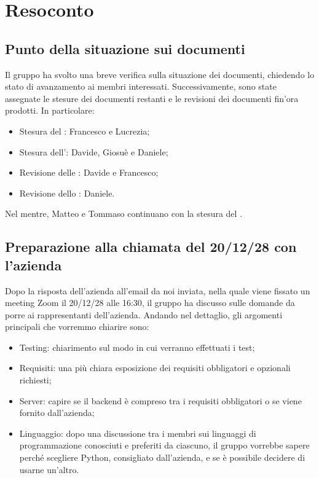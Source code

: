 \section{Resoconto}

\subsection{Punto della situazione sui documenti}

Il gruppo \gruppo{} ha svolto una breve verifica sulla situazione dei documenti, chiedendo lo stato di avanzamento ai membri interessati. Successivamente, sono state assegnate le stesure dei documenti restanti e le revisioni dei documenti fin'ora prodotti. In particolare:
\begin{itemize}
\item Stesura del \PdQ{}: Francesco e Lucrezia;
\item Stesura dell'\AdR{}: Davide, Giosuè e Daniele;
\item Revisione delle \NdP{}: Davide e Francesco;
\item Revisione dello \SdF{}: Daniele.
\end{itemize}
Nel mentre, Matteo e Tommaso continuano con la stesura del \PdP{}.


\subsection{Preparazione alla chiamata del 20/12/28 con l'azienda}

Dopo la risposta dell'azienda all'email da noi inviata, nella quale viene fissato un meeting Zoom il 20/12/28 alle 16:30, il gruppo ha discusso sulle domande da porre ai rappresentanti dell'azienda. Andando nel dettaglio, gli argomenti principali che vorremmo chiarire sono:
\begin{itemize}

\item Testing: chiarimento sul modo in cui verranno effettuati i test;

\item Requisiti: una più chiara esposizione dei requisiti obbligatori e opzionali richiesti;

\item Server: capire se il backend è compreso tra i requisiti obbligatori o se viene fornito dall'azienda;

\item Linguaggio: dopo una discussione tra i membri sui linguaggi di programmazione conosciuti e preferiti da ciascuno, il gruppo vorrebbe sapere perché scegliere Python, consigliato dall'azienda, e se è possibile decidere di usarne un'altro.

\end{itemize}


